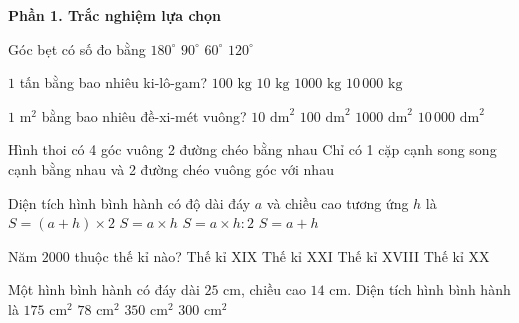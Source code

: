 \textbf{Phần 1. Trắc nghiệm lựa chọn}

\begin{ex} %
Góc bẹt có số đo bằng
\choice
{\True $180^\circ$}
{$90^\circ$}
{$60^\circ$}
{$120^\circ$}
\end{ex}

\begin{ex} %
$1$ tấn bằng bao nhiêu ki-lô-gam?
\choice
{$100\text{ kg}$}
{$10\text{ kg}$}
{\True $1000\text{ kg}$}
{$10\,000\text{ kg}$}
\end{ex}

\begin{ex} %
$1\text{ m}^2$ bằng bao nhiêu đề-xi-mét vuông?
\choice
{$10\text{ dm}^2$}
{\True $100\text{ dm}^2$}
{$1000\text{ dm}^2$}
{$10\,000\text{ dm}^2$}
\end{ex}

\begin{ex} %
Hình thoi có
\choice
{4 góc vuông}
{2 đường chéo bằng nhau}
{Chỉ có 1 cặp cạnh song song}
{ cạnh bằng nhau và 2 đường chéo vuông góc với nhau}
\end{ex}

\begin{ex} %
Diện tích hình bình hành có độ dài đáy $a$ và chiều cao tương ứng $h$ là
\choice
{$S = (a + h) \times 2$}
{\True $S = a \times h$}
{$S = a \times h : 2$}
{$S = a + h$}
\end{ex}

\begin{ex} %
Năm $2000$ thuộc thế kỉ nào?
\choice
{Thế kỉ XIX}
{Thế kỉ XXI}
{Thế kỉ XVIII}
{\True Thế kỉ XX}
\end{ex}

\begin{ex} %
Một hình bình hành có đáy dài $25\text{ cm}$, chiều cao $14\text{ cm}$. Diện tích hình bình hành là
\choice
{$175\text{ cm}^2$}
{$78\text{ cm}^2$}
{\True $350\text{ cm}^2$}
{$300\text{ cm}^2$}
\end{ex}

